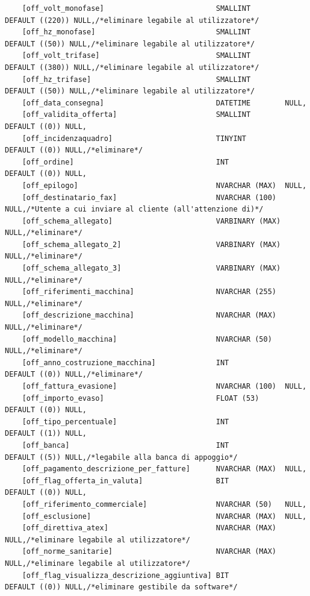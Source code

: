 \documentclass[12pt]{article}
\begin{document}
\begin{lstlisting}
    [off_volt_monofase]                          SMALLINT        DEFAULT ((220)) NULL,/*eliminare legabile al utilizzatore*/
    [off_hz_monofase]                            SMALLINT        DEFAULT ((50)) NULL,/*eliminare legabile al utilizzatore*/
    [off_volt_trifase]                           SMALLINT        DEFAULT ((380)) NULL,/*eliminare legabile al utilizzatore*/
    [off_hz_trifase]                             SMALLINT        DEFAULT ((50)) NULL,/*eliminare legabile al utilizzatore*/
    [off_data_consegna]                          DATETIME        NULL,
    [off_validita_offerta]                       SMALLINT        DEFAULT ((0)) NULL,
    [off_incidenzaquadro]                        TINYINT         DEFAULT ((0)) NULL,/*eliminare*/
    [off_ordine]                                 INT             DEFAULT ((0)) NULL,
    [off_epilogo]                                NVARCHAR (MAX)  NULL,
    [off_destinatario_fax]                       NVARCHAR (100)  NULL,/*Utente a cui inviare al cliente (all'attenzione di)*/
    [off_schema_allegato]                        VARBINARY (MAX) NULL,/*eliminare*/
    [off_schema_allegato_2]                      VARBINARY (MAX) NULL,/*eliminare*/
    [off_schema_allegato_3]                      VARBINARY (MAX) NULL,/*eliminare*/
    [off_riferimenti_macchina]                   NVARCHAR (255)  NULL,/*eliminare*/
    [off_descrizione_macchina]                   NVARCHAR (MAX)  NULL,/*eliminare*/
    [off_modello_macchina]                       NVARCHAR (50)   NULL,/*eliminare*/
    [off_anno_costruzione_macchina]              INT             DEFAULT ((0)) NULL,/*eliminare*/
    [off_fattura_evasione]                       NVARCHAR (100)  NULL,
    [off_importo_evaso]                          FLOAT (53)      DEFAULT ((0)) NULL,
    [off_tipo_percentuale]                       INT             DEFAULT ((1)) NULL,
    [off_banca]                                  INT             DEFAULT ((5)) NULL,/*legabile alla banca di appoggio*/
    [off_pagamento_descrizione_per_fatture]      NVARCHAR (MAX)  NULL,
    [off_flag_offerta_in_valuta]                 BIT             DEFAULT ((0)) NULL,
    [off_riferimento_commerciale]                NVARCHAR (50)   NULL,
    [off_esclusione]                             NVARCHAR (MAX)  NULL,
    [off_direttiva_atex]                         NVARCHAR (MAX)  NULL,/*eliminare legabile al utilizzatore*/
    [off_norme_sanitarie]                        NVARCHAR (MAX)  NULL,/*eliminare legabile al utilizzatore*/
    [off_flag_visualizza_descrizione_aggiuntiva] BIT             DEFAULT ((0)) NULL,/*eliminare gestibile da software*/

\end{lstlisting}
\end{document}
